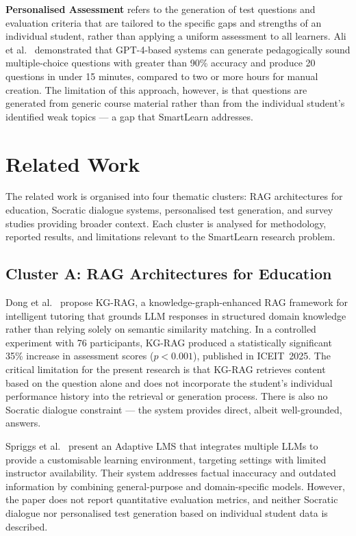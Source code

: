 \documentclass[12pt,a4paper]{report}
\begin{document}
\textbf{Personalised Assessment} refers to the generation of test questions and
evaluation criteria that are tailored to the specific gaps and strengths of an
individual student, rather than applying a uniform assessment to all learners. Ali et
al.~\cite{ref10} demonstrated that GPT-4-based systems can generate pedagogically
sound multiple-choice questions with greater than 90\% accuracy and produce 20
questions in under 15 minutes, compared to two or more hours for manual creation. The
limitation of this approach, however, is that questions are generated from generic
course material rather than from the individual student's identified weak topics --- a
gap that SmartLearn addresses.

\section{Related Work}

The related work is organised into four thematic clusters: RAG architectures for
education, Socratic dialogue systems, personalised test generation, and survey studies
providing broader context. Each cluster is analysed for methodology, reported results,
and limitations relevant to the SmartLearn research problem.

\subsection{Cluster A: RAG Architectures for Education}

Dong et al.~\cite{ref1} propose KG-RAG, a knowledge-graph-enhanced RAG framework for
intelligent tutoring that grounds LLM responses in structured domain knowledge rather
than relying solely on semantic similarity matching. In a controlled experiment with
76 participants, KG-RAG produced a statistically significant 35\% increase in
assessment scores ($p < 0.001$), published in ICEIT~2025. The critical limitation for
the present research is that KG-RAG retrieves content based on the question alone and
does not incorporate the student's individual performance history into the retrieval or
generation process. There is also no Socratic dialogue constraint --- the system
provides direct, albeit well-grounded, answers.

Spriggs et al.~\cite{ref2} present an Adaptive LMS that integrates multiple LLMs to
provide a customisable learning environment, targeting settings with limited instructor
availability. Their system addresses factual inaccuracy and outdated information by
combining general-purpose and domain-specific models. However, the paper does not
report quantitative evaluation metrics, and neither Socratic dialogue nor personalised
test generation based on individual student data is described.
\end{document}
